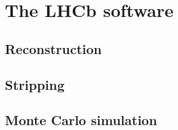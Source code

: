 
\section{The LHCb software}
\label{sec:detector:software}

\subsection{Reconstruction}
\label{sec:detector:software:reconstruction}

\subsection{Stripping}
\label{sec:detector:software:stripping}

\subsection{Monte Carlo simulation}
\label{sec:detector:software:simulation}